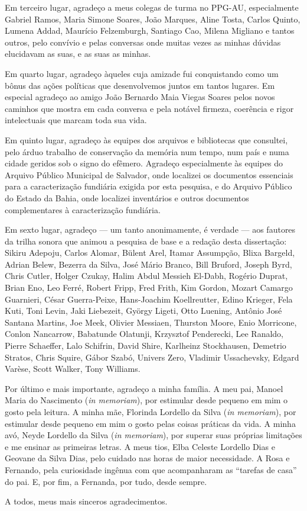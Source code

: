 \begin{agradecimentos}
Em terceiro lugar, agradeço a meus colegas de turma no PPG-AU, especialmente Gabriel Ramos, Maria Simone Soares, João Marques, Aline Tosta, Carlos Quinto, Lumena Addad, Maurício Felzemburgh, Santiago Cao, Milena Migliano e tantos outros, pelo convívio e pelas conversas onde muitas vezes as minhas dúvidas elucidavam as suas, e as suas as minhas.

Em quarto lugar, agradeço àqueles cuja amizade fui conquistando como um bônus das ações políticas que desenvolvemos juntos em tantos lugares. Em especial agradeço ao amigo João Bernardo Maia Viegas Soares pelos novos caminhos que mostra em cada conversa e pela notável firmeza, coerência e rigor intelectuais que marcam toda sua vida.

Em quinto lugar, agradeço às equipes dos arquivos e bibliotecas que consultei, pelo árduo trabalho de conservação da memória num tempo, num país e numa cidade geridos sob o signo do efêmero. Agradeço especialmente às equipes do Arquivo Público Municipal de Salvador, onde localizei os documentos essenciais para a caracterização fundiária exigida por esta pesquisa, e do Arquivo Público do Estado da Bahia, onde localizei inventários e outros documentos complementares à caracterização fundiária.

Em sexto lugar, agradeço --- um tanto anonimamente, é verdade --- aos fautores da trilha sonora que animou a pesquisa de base e a redação desta dissertação: Sikiru Adepoju, Carlos Alomar, Bülent Arel, Itamar Assumpção, Blixa Bargeld, Adrian Belew, Bezerra da Silva, José Mário Branco, Bill Bruford, Joseph Byrd, Chris Cutler, Holger Czukay, Halim Abdul Messieh El-Dabh, Rogério Duprat, Brian Eno, Leo Ferré, Robert Fripp, Fred Frith, Kim Gordon, Mozart Camargo Guarnieri, César Guerra-Peixe, Hans-Joachim Koellreutter, Edino Krieger, Fela Kuti, Toni Levin, Jaki Liebezeit, György Ligeti, Otto Luening, Antônio José Santana Martins, Joe Meek, Olivier Messiaen, Thurston Moore, Enio Morricone, Conlon Nancarrow, Babatunde Olatunji, Krzysztof Penderecki, Lee Ranaldo, Pierre Schaeffer, Lalo Schifrin, David Shire, Karlheinz Stockhausen, Demetrio Stratos, Chris Squire, Gábor Szabó, Univers Zero, Vladimir Ussachevsky, Edgard Varèse, Scott Walker, Tony Williams. 

Por último e mais importante, agradeço a minha família. A meu pai, Manoel Maria do Nascimento (\textit{in memoriam}), por estimular desde pequeno em mim o gosto pela leitura. A minha mãe, Florinda Lordello da Silva (\textit{in memoriam}), por estimular desde pequeno em mim o gosto pelas coisas práticas da vida. A minha avó, Neyde Lordello da Silva (\textit{in memoriam}), por superar suas próprias limitações e me ensinar as primeiras letras. A meus tios, Elba Celeste Lordello Dias e Geovane da Silva Dias, pelo cuidado nas horas de maior necessidade. A Rosa e Fernando, pela curiosidade ingênua com que acompanharam as ``tarefas de casa'' do pai. E, por fim, a Fernanda, por tudo, desde sempre.

A todos, meus mais sinceros agradecimentos.

\end{agradecimentos}
